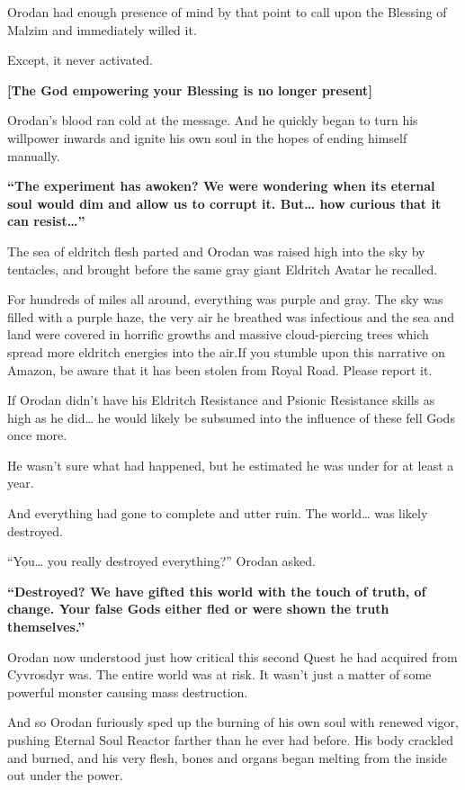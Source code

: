 \documentclass[a4paper,10pt]{book}
\begin{document}
Orodan had enough presence of mind by that point to call upon the Blessing of Malzim and immediately willed it.\par
Except, it never activated.\par
\textbf{[The God empowering your Blessing is no longer present]}\par
Orodan’s blood ran cold at the message. And he quickly began to turn his willpower inwards and ignite his own soul in the hopes of ending himself manually.\par
\textbf{“The experiment has awoken? We were wondering when its eternal soul would dim and allow us to corrupt it. But… how curious that it can resist…”}\par
The sea of eldritch flesh parted and Orodan was raised high into the sky by tentacles, and brought before the same gray giant Eldritch Avatar he recalled.\par
For hundreds of miles all around, everything was purple and gray. The sky was filled with a purple haze, the very air he breathed was infectious and the sea and land were covered in horrific growths and massive cloud-piercing trees which spread more eldritch energies into the air.If you stumble upon this narrative on Amazon, be aware that it has been stolen from Royal Road. Please report it.\par
If Orodan didn’t have his Eldritch Resistance and Psionic Resistance skills as high as he did… he would likely be subsumed into the influence of these fell Gods once more.\par
He wasn’t sure what had happened, but he estimated he was under for at least a year.\par
And everything had gone to complete and utter ruin. The world… was likely destroyed.\par
“You… you really destroyed everything?” Orodan asked.\par
\textbf{“Destroyed? We have gifted this world with the touch of truth, of change. Your false Gods either fled or were shown the truth themselves.”}\par
Orodan now understood just how critical this second Quest he had acquired from Cyvrosdyr was. The entire world was at risk. It wasn’t just a matter of some powerful monster causing mass destruction.\par
And so Orodan furiously sped up the burning of his own soul with renewed vigor, pushing Eternal Soul Reactor farther than he ever had before. His body crackled and burned, and his very flesh, bones and organs began melting from the inside out under the power.\par
\end{document}
